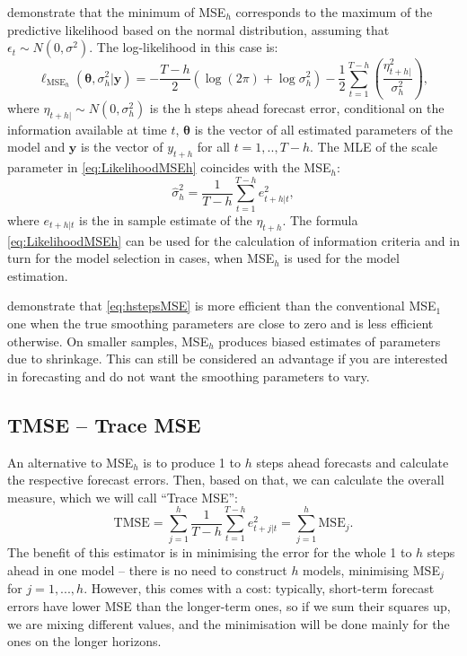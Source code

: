 \documentclass[]{book}
\theoremstyle{definition}
\theoremstyle{definition}
\theoremstyle{definition}
\theoremstyle{definition}
\theoremstyle{remark}
\begin{document}
\citet{Svetunkov2020Multistep} demonstrate that the minimum of MSE\(_h\) corresponds to the maximum of the predictive likelihood based on the normal distribution, assuming that \(\epsilon_t \sim N(0,\sigma^2)\). The log-likelihood in this case is:
\begin{equation}
    \ell_{\mathrm{MSE}_h}(\boldsymbol{\theta}, {\sigma^2_h} | \mathbf{y}) = -\frac{T-h}{2} \left( \log(2 \pi) + \log \sigma^2_h \right) -\frac{1}{2} \sum_{t=1}^{T-h} \left( \frac{\eta_{t+h|}^2}{\sigma^2_h} \right) ,
  \label{eq:LikelihoodMSEh}
\end{equation}
where \(\eta_{t+h|} \sim N(0, \sigma_h^2)\) is the h steps ahead forecast error, conditional on the information available at time \(t\), \(\boldsymbol{\theta}\) is the vector of all estimated parameters of the model and \(\mathbf{y}\) is the vector of \(y_{t+h}\) for all \(t=1,..,T-h\). The MLE of the scale parameter in \eqref{eq:LikelihoodMSEh} coincides with the MSE\(_h\):
\begin{equation}
    \hat{\sigma}_h^2 = \frac{1}{T-h} \sum_{t=1}^{T-h} e_{t+h|t}^2 ,
  \label{eq:hstepsSigma}
\end{equation}
where \(e_{t+h|t}\) is the in sample estimate of the \(\eta_{t+h}\). The formula \eqref{eq:LikelihoodMSEh} can be used for the calculation of information criteria and in turn for the model selection in cases, when MSE\(_h\) is used for the model estimation.

\citet{Svetunkov2020Multistep} demonstrate that \eqref{eq:hstepsMSE} is more efficient \citep[see Section 4.3 of][]{SvetunkovSBA} than the conventional MSE\(_1\) one when the true smoothing parameters are close to zero and is less efficient otherwise. On smaller samples, MSE\(_h\) produces biased estimates of parameters due to shrinkage. This can still be considered an advantage if you are interested in forecasting and do not want the smoothing parameters to vary.

\hypertarget{multistepLossesTMSE}{%
\subsection{TMSE -- Trace MSE}\label{multistepLossesTMSE}}

An alternative to MSE\(_h\) is to produce 1 to \(h\) steps ahead forecasts and calculate the respective forecast errors. Then, based on that, we can calculate the overall measure, which we will call ``Trace MSE'':
\begin{equation}
    \mathrm{TMSE} = \sum_{j=1}^h \frac{1}{T-h} \sum_{t=1}^{T-h} e_{t+j|t}^2 = \sum_{j=1}^h \mathrm{MSE}_j.
  \label{eq:TMSE}
\end{equation}
The benefit of this estimator is in minimising the error for the whole 1 to \(h\) steps ahead in one model -- there is no need to construct \(h\) models, minimising MSE\(_j\) for \(j=1,...,h\). However, this comes with a cost: typically, short-term forecast errors have lower MSE than the longer-term ones, so if we sum their squares up, we are mixing different values, and the minimisation will be done mainly for the ones on the longer horizons.
\end{document}
